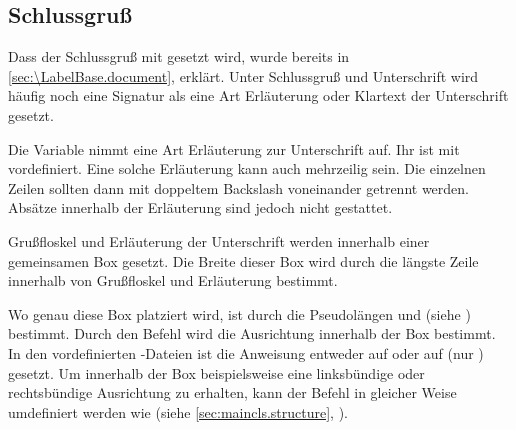 \subsection{Schlussgruß}
\BeginIndexGroup
{}%

Dass der Schlussgruß mit 
gesetzt wird, wurde bereits in \autoref{sec:\LabelBase.document},
 erklärt. %
\iffalse %
Unter dem Schlussgruß wird häufig noch eine Signatur, eine Art Erläuterung zur
Unterschrift, gesetzt. Die Unterschrift wiederum findet Platz zwischen dem
Schlussgruß und der Signatur.%
\else%
Unter Schlussgruß und Unterschrift wird häufig noch eine Signatur als eine Art
Erläuterung oder Klartext der Unterschrift gesetzt.%
\fi%

\begin{Declaration}
\end{Declaration}
Die Variable  nimmt eine Art Erläuterung
zur Unterschrift auf. Ihr  ist mit
 vordefiniert. Eine
solche Erläuterung kann auch mehrzeilig sein. Die einzelnen Zeilen sollten
dann mit doppeltem Backslash voneinander getrennt
werden. Absätze innerhalb der Erläuterung sind jedoch nicht
gestattet.%
%
\EndIndexGroup


\begin{Declaration}
\end{Declaration}
Grußfloskel und Erläuterung der
Unterschrift werden innerhalb einer gemeinsamen Box
gesetzt.  Die Breite dieser Box wird durch die längste Zeile innerhalb von
Grußfloskel und Erläuterung bestimmt.

Wo genau diese Box platziert wird, ist durch die Pseudolängen
 und
(siehe ) bestimmt.  Durch den Befehl
 wird die Ausrichtung innerhalb der Box bestimmt. In
den vordefinierten -Dateien ist die
Anweisung entweder auf  oder
auf  (nur ) gesetzt. Um innerhalb der Box
beispielsweise eine linksbündige oder rechtsbündige Ausrichtung zu erhalten,
kann der Befehl in gleicher Weise umdefiniert werden wie
 (siehe %
\iffalse %
das entsprechende Beispiel in %
\fi %
\autoref{sec:maincls.structure}, ).

